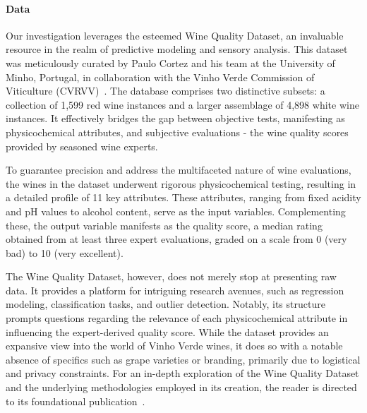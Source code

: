 \documentclass[12pt]{article}
\begin{document}
\paragraph{Data}
Our investigation leverages the esteemed Wine Quality Dataset, an invaluable resource in the realm of predictive modeling and sensory analysis. This dataset was meticulously curated by Paulo Cortez and his team at the University of Minho, Portugal, in collaboration with the Vinho Verde Commission of Viticulture (CVRVV)~\citep{wine_quality_source}. The database comprises two distinctive subsets: a collection of 1,599 red wine instances and a larger assemblage of 4,898 white wine instances. It effectively bridges the gap between objective tests, manifesting as physicochemical attributes, and subjective evaluations - the wine quality scores provided by seasoned wine experts.

To guarantee precision and address the multifaceted nature of wine evaluations, the wines in the dataset underwent rigorous physicochemical testing, resulting in a detailed profile of 11 key attributes. These attributes, ranging from fixed acidity and pH values to alcohol content, serve as the input variables. Complementing these, the output variable manifests as the quality score, a median rating obtained from at least three expert evaluations, graded on a scale from 0 (very bad) to 10 (very excellent).

The Wine Quality Dataset, however, does not merely stop at presenting raw data. It provides a platform for intriguing research avenues, such as regression modeling, classification tasks, and outlier detection. Notably, its structure prompts questions regarding the relevance of each physicochemical attribute in influencing the expert-derived quality score. While the dataset provides an expansive view into the world of Vinho Verde wines, it does so with a notable absence of specifics such as grape varieties or branding, primarily due to logistical and privacy constraints. For an in-depth exploration of the Wine Quality Dataset and the underlying methodologies employed in its creation, the reader is directed to its foundational publication~\citep{wine_quality_source}.
\end{document}
